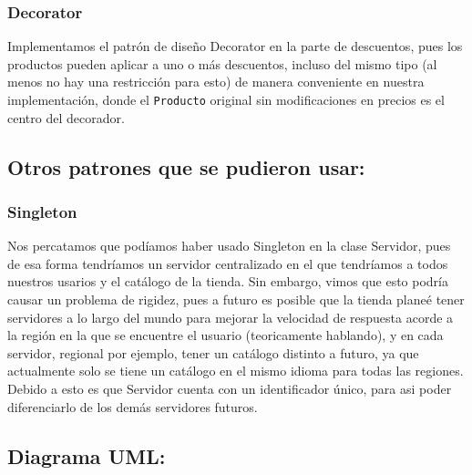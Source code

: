 \documentclass{article}
\newcommand{\code}[1]{\textcolor{white!25!black}{\texttt{#1}}}
\begin{document}
\subsubsection*{Decorator}
Implementamos el patrón de diseño Decorator en la parte de descuentos, pues los productos
pueden aplicar a uno o más descuentos, incluso del mismo tipo (al menos no hay una restricción
para esto) de manera conveniente en nuestra implementación, donde el \code{Producto} original
sin modificaciones en precios es el centro del decorador.

\subsection*{Otros patrones que se pudieron usar:}
\subsubsection*{Singleton}
Nos percatamos que podíamos haber usado Singleton en la clase Servidor, pues de esa forma
tendríamos un servidor centralizado en el que tendríamos a todos nuestros usarios y el catálogo
de la tienda. Sin embargo, vimos que esto podría causar un problema de rigidez, pues a futuro
es posible que la tienda planeé tener servidores a lo largo del mundo para mejorar la velocidad
de respuesta acorde a la región en la que se encuentre el usuario (teoricamente hablando), y
en cada servidor, regional por ejemplo, tener un catálogo distinto a futuro, ya que actualmente
solo se tiene un catálogo en el mismo idioma para todas las regiones. Debido a esto es que
Servidor cuenta con un identificador único, para asi poder diferenciarlo de los demás servidores
futuros.

\newpage
\subsection*{Diagrama UML:}
\end{document}
